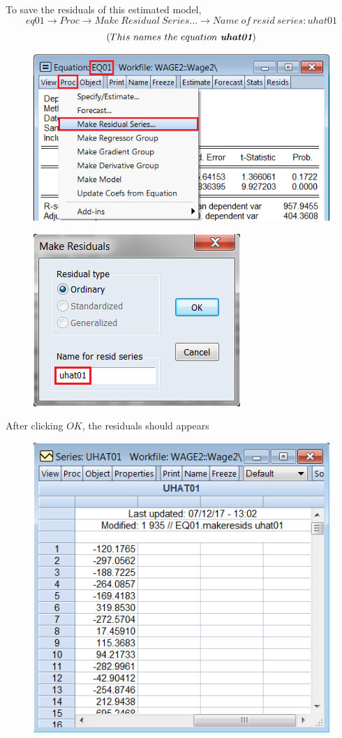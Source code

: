\documentclass[12pt]{report}
\begin{document}
\vspace{-\baselineskip}
\noindent To save the residuals of this estimated model,
$$eq01 \to Proc \to Make\ Residual\ Series \dots \to Name\ of\ resid\ series: uhat01$$
$$(This\ names\ the\ equation\ \textit{\textbf{uhat01}})$$
\begin{figure}[H]
	\centering
	\includegraphics{q3_16}
\end{figure}
\vspace{-\baselineskip}
\begin{figure}[H]
	\centering
	\includegraphics{q3_17}
\end{figure}
\vspace{-\baselineskip}
\noindent After clicking $OK$, the residuals should appears
\begin{figure}[H]
	\centering
	\includegraphics{q3_18}
\end{figure}
\end{document}
